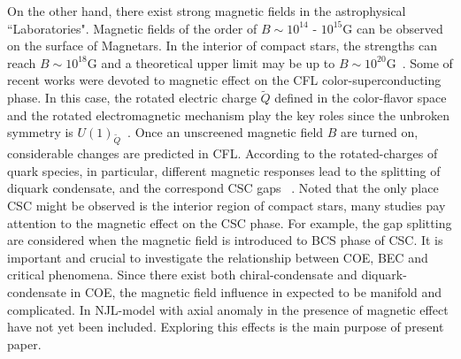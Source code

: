 \documentclass[prd, showpacs,nofootinbib,amsmath,amssymb]{revtex4}
\begin{document}
On the other hand, there exist strong magnetic fields in the astrophysical ``Laboratories".
Magnetic fields of the order of $B \sim 10^{14}$ - $10^{15}\text{G}$ can be observed on the surface of Magnetars.
In the interior of compact stars, the strengths can reach $B \sim 10^{18}\text{G}$ and a theoretical upper limit may be up to $B \sim 10^{20}\text{G}$~\cite{dong2001,lai1991cold}.
Some of recent works were devoted to magnetic effect on the CFL color-superconducting phase.
In this case, the rotated electric charge $\widetilde{Q}$ defined in the color-flavor space and the rotated electromagnetic mechanism play the key roles since the unbroken symmetry is $U(1)_{\widetilde{Q}}$~\cite{alford1998qcd,alford2000magnetic}.
Once an unscreened magnetic field $B$ are turned on, considerable changes are predicted in CFL.
According to the rotated-charges of quark species, in particular, different magnetic responses lead to the splitting of diquark condensate, and the correspond CSC gaps ~\cite{ferrer2005magnetic,fukushima2008color,ferrer2006color,ferrer2007magnetic}.
Noted that the only place CSC might be observed is the interior region of compact stars, many studies pay attention to the magnetic effect on the CSC  phase.
For example, the gap splitting are considered when the magnetic field is introduced to BCS phase of CSC.
It is important and crucial to investigate the relationship between COE, BEC and critical phenomena.
Since there exist both chiral-condensate and diquark-condensate in COE, the magnetic field influence in expected to be manifold and complicated.
In NJL-model with axial anomaly in the presence of magnetic effect have not yet been included.
Exploring this effects is the main purpose of present paper.
\end{document}

